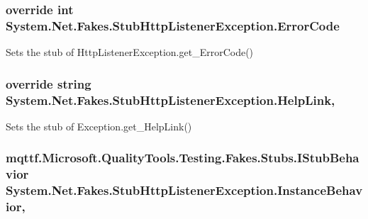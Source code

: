 \hypertarget{class_system_1_1_net_1_1_fakes_1_1_stub_http_listener_exception_a3ddfe606d6418f11687384e01a33c622}{
\subsubsection[{Error\-Code}]{\setlength{\rightskip}{0pt plus 5cm}override int System.\-Net.\-Fakes.\-Stub\-Http\-Listener\-Exception.\-Error\-Code\hspace{0.3cm}{\ttfamily [get]}}}\label{class_system_1_1_net_1_1_fakes_1_1_stub_http_listener_exception_a3ddfe606d6418f11687384e01a33c622}


Sets the stub of Http\-Listener\-Exception.\-get\-\_\-\-Error\-Code()

\hypertarget{class_system_1_1_net_1_1_fakes_1_1_stub_http_listener_exception_a3f92628202a10a0cd87281d7659c3b66}{
\subsubsection[{Help\-Link}]{\setlength{\rightskip}{0pt plus 5cm}override string System.\-Net.\-Fakes.\-Stub\-Http\-Listener\-Exception.\-Help\-Link\hspace{0.3cm}{\ttfamily [get]}, {\ttfamily [set]}}}\label{class_system_1_1_net_1_1_fakes_1_1_stub_http_listener_exception_a3f92628202a10a0cd87281d7659c3b66}


Sets the stub of Exception.\-get\-\_\-\-Help\-Link()

\hypertarget{class_system_1_1_net_1_1_fakes_1_1_stub_http_listener_exception_a8debaabbd835b28d70acb154441d6f49}{
\subsubsection[{Instance\-Behavior}]{\setlength{\rightskip}{0pt plus 5cm}mqttf.\-Microsoft.\-Quality\-Tools.\-Testing.\-Fakes.\-Stubs.\-I\-Stub\-Behavior System.\-Net.\-Fakes.\-Stub\-Http\-Listener\-Exception.\-Instance\-Behavior\hspace{0.3cm}{\ttfamily [get]}, {\ttfamily [set]}}}\label{class_system_1_1_net_1_1_fakes_1_1_stub_http_listener_exception_a8debaabbd835b28d70acb154441d6f49}


